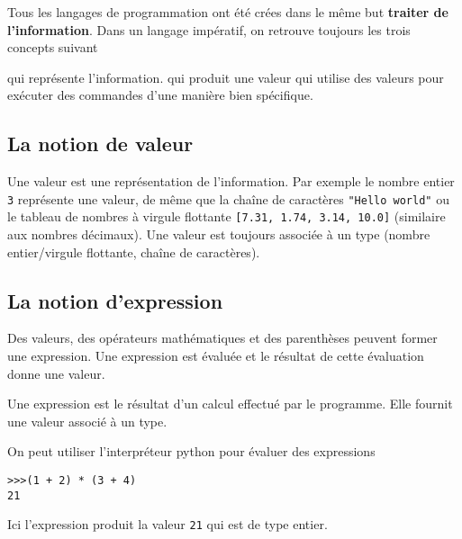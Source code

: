
Tous les langages de programmation ont été crées dans le même but \textbf{traiter de l'information}. Dans un langage impératif, on retrouve toujours les trois concepts suivant 
\begin{itemize}
	 qui représente l'information.
	 qui produit une valeur
	 qui utilise des valeurs pour exécuter des commandes d'une manière bien spécifique.
\end{itemize}

\subsection{La notion de valeur}
Une valeur est une représentation de l'information. Par exemple le nombre entier \lstinline{3} représente une valeur, de même que la chaîne de caractères \lstinline{"Hello world"} ou le tableau de nombres à virgule flottante \lstinline{[7.31, 1.74, 3.14, 10.0]}  (similaire aux nombres décimaux). Une valeur est toujours associée à un type (nombre entier/virgule flottante, chaîne de caractères).\\

\subsection{La notion d'expression}
Des valeurs, des opérateurs mathématiques et des parenthèses peuvent former une expression. Une expression est évaluée et le résultat de cette évaluation donne une valeur. 
\begin{mydefinition}
	Une expression est le résultat d'un calcul effectué par le programme. Elle fournit une valeur associé à un type.
\end{mydefinition}

On peut utiliser l'interpréteur python pour évaluer des expressions
\begin{myexample}
	\begin{lstlisting}[numbers=none]
>>>(1 + 2) * (3 + 4)
21
	\end{lstlisting}
	Ici l'expression produit la valeur \lstinline{21} qui est de type entier.
\end{myexample}

